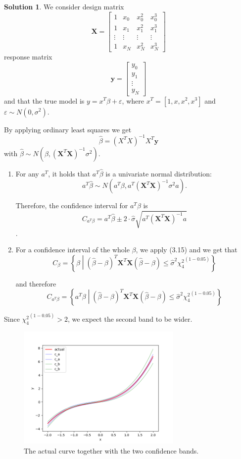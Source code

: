 \documentclass[]{book}
\theoremstyle{definition}
\newtheorem*{soln}{Solution}
\newcommand{\XX}{\mathbf{X}} \newcommand{\YY}{\mathbf{Y}}
\newcommand{\yy}{\mathbf{y}}
\begin{document}
\begin{enumerate}
	\begin{soln}
		We consider design matrix
		\begin{equation}
			\XX = 
			\begin{bmatrix}
				1 & x_0 & x_0^2 & x_0^3 \\
				1 & x_1 & x_1^2 & x_1^3 \\
				\vdots & \vdots & \vdots & \vdots \\
				1 & x_N & x_N^2 & x_N^3
			\end{bmatrix}
		\end{equation}
		response matrix
		\begin{equation}
			\yy =
			\begin{bmatrix}
				y_0 \\
				y_1 \\
				\vdots \\
				y_N
			\end{bmatrix}
		\end{equation}
		and that the true model is $y=x^T\beta+\varepsilon$, where
		$x^T=[1, x, x^2, x^3]$ and $\varepsilon\sim N(0,\sigma^2)$.

		By applying ordinary least squares we get
		\[\hat\beta=(X^TX)^{-1}X^T \yy\]
		with $\hat\beta\sim N(\beta,(\XX^T\XX)^{-1}\sigma^2)$.
		\begin{enumerate}
			\item For
		any $a^T$, it holds that $a^T\hat\beta$ is a univariate normal
		distribution: 
		\[a^T\hat\beta\sim N(a^T\beta,a^T(\XX^T\XX)^{-1}\sigma^2a).\]

		Therefore, the confidence interval for $a^T\beta$ is 
		\[C_{a^T\beta}=a^T\hat\beta\pm 2\cdot\hat\sigma\sqrt{a^T(\XX^T\XX)^{-1}a}\].

			\item For a confidence interval of the whole $\beta$, 
			we apply (3.15) and we get that 
			\[C_{\beta}=\left\{\beta\middle|(\hat\beta-\beta)^T\XX^T\XX(\hat\beta-\beta)\le\hat\sigma^2{\chi_4^2}^{(1-0.05)}\right\}\]
		
			and therefore
			\[C_{a^T\beta}=\left\{a^T\beta\middle|(\hat\beta-\beta)^T\XX^T\XX(\hat\beta-\beta)\le\hat\sigma^2{\chi_4^2}^{(1-0.05)}\right\}\]
		\end{enumerate}

		Since ${\chi_4^2}^{(1-0.05)}>2$, we expect the second band to be
		wider.

		\begin{figure}[ht]
			\label{fig:exercise3.2}
			\includegraphics[width=8cm]{../plots/ex3-2.png}
			\centering
			\caption{The actual curve together with the two confidence bands.}
		\end{figure}
	\end{soln}
\end{enumerate}
\end{document}
